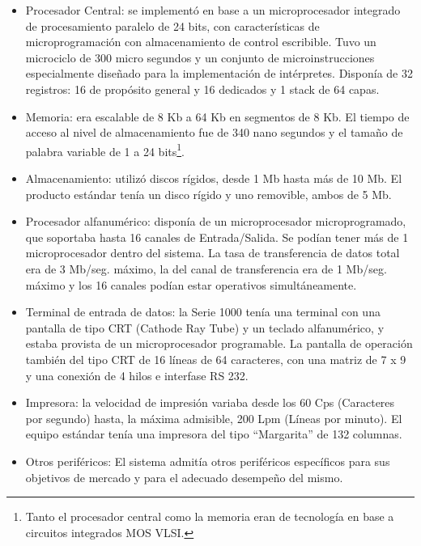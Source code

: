 \documentclass[%
  	final,
%
	notitlepage,
	narroweqnarray,
	inline,
 	twoside,
	]{ieee}
\begin{document}
\begin{itemize}
\item Procesador Central: se implement\'o en base a un microprocesador integrado de procesamiento paralelo de 24 bits, con caracter\'isticas de microprogramaci\'on con almacenamiento de control escribible. Tuvo un microciclo de 300 micro segundos y un conjunto de microinstrucciones especialmente dise\~nado para la implementaci\'on de int\'erpretes. Dispon\'ia de 32 registros: 16 de prop\'osito general y 16 dedicados y 1 stack de 64 capas.\\

\item Memoria: era escalable de 8 Kb a 64 Kb en segmentos de 8 Kb. El tiempo de acceso al nivel de almacenamiento fue de 340 nano segundos y el tama\~no de palabra variable de 1 a 24 bits\footnote{Tanto el procesador central como la memoria eran de tecnolog\'ia en base a circuitos integrados MOS VLSI.}.\\

\item Almacenamiento: utiliz\'o discos r\'igidos, desde 1 Mb hasta m\'as de 10 Mb. El producto est\'andar ten\'ia un disco r\'igido y uno removible, ambos de 5 Mb.\\

\item Procesador alfanum\'erico: dispon\'ia de un microprocesador microprogramado, que soportaba hasta 16 canales de Entrada/Salida. Se pod\'ian tener m\'as de 1 microprocesador dentro del sistema. La tasa de transferencia de datos total era de 3 Mb/seg. m\'aximo, la del canal de transferencia era de 1 Mb/seg. m\'aximo y los 16 canales pod\'ian estar operativos simult\'aneamente.\\

\item Terminal de entrada de datos: la Serie 1000 ten\'ia una terminal con una pantalla de tipo CRT (Cathode Ray Tube) y un teclado alfanum\'erico, y estaba provista de un microprocesador programable. La pantalla de operaci\'on tambi\'en del tipo CRT de 16 l\'ineas de 64 caracteres, con una matriz de 7 x 9 y una conexi\'on de 4 hilos e interfase RS 232.\\

\item Impresora: la velocidad de impresi\'on variaba desde los 60 Cps (Caracteres por segundo) hasta, la m\'axima admisible, 200 Lpm (L\'ineas por minuto). El equipo est\'andar ten\'ia una impresora del tipo ``Margarita'' de 132 columnas.\\

\item Otros perif\'ericos: El sistema admit\'ia otros perif\'ericos espec\'ificos para sus objetivos de mercado y para el adecuado desempe\~no del mismo.
\end{itemize}
\end{document}
